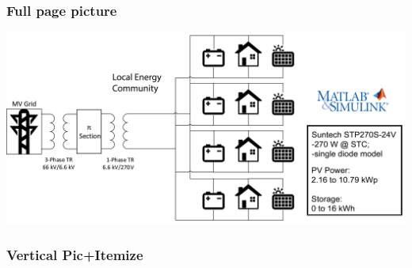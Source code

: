 \documentclass[xcolor=dvipsnames,aspectratio=169]{beamer} %
\begin{document}
{\begin{frame}[t]
\begin{minipage}{0.45\textwidth}
\begin{overprint}
\end{overprint}

\end{minipage}

\end{frame}

\begin{frame}[t]

\vspace{-20pt}

\frametitle{Full page picture}
\includegraphics[width=0.85\paperwidth]{Immagini/Grid2mod.png}

\end{frame}

\begin{frame}[t]

\frametitle{Vertical Pic+Itemize}

\begin{minipage}{0.35\textwidth}

\vspace{-24pt}


\end{minipage}
\end{frame}}
\end{document}
